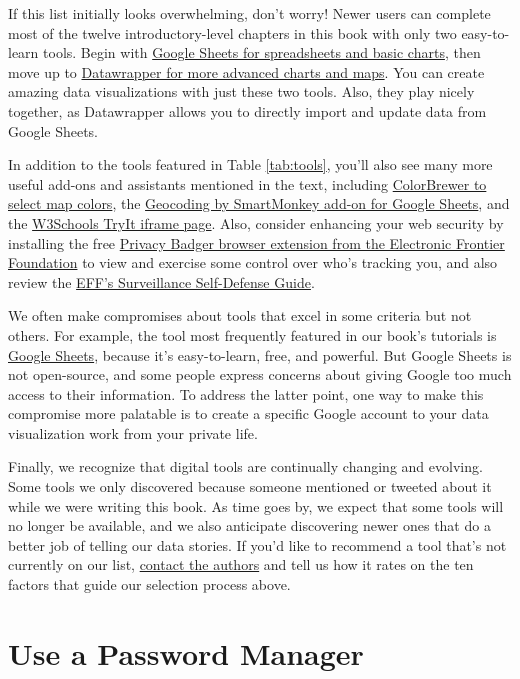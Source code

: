 \documentclass[
  english,
]{book}
\begin{document}
If this list initially looks overwhelming, don't worry! Newer users can complete most of the twelve introductory-level chapters in this book with only two easy-to-learn tools. Begin with \href{spreadsheet-tools.html}{Google Sheets for spreadsheets and basic charts}, then move up to \href{chart-datawrapper.html}{Datawrapper for more advanced charts and maps}. You can create amazing data visualizations with just these two tools. Also, they play nicely together, as Datawrapper allows you to directly import and update data from Google Sheets.

In addition to the tools featured in Table \ref{tab:tools}, you'll also see many more useful add-ons and assistants mentioned in the text, including \href{map-design.html}{ColorBrewer to select map colors}, the \href{geocode.html}{Geocoding by SmartMonkey add-on for Google Sheets}, and the \href{https://www.w3schools.com/tags/tryit.asp?filename=tryhtml_iframe}{W3Schools TryIt iframe page}. Also, consider enhancing your web security by installing the free \href{https://privacybadger.org/}{Privacy Badger browser extension from the Electronic Frontier Foundation} to view and exercise some control over who's tracking you, and also review the \href{https://ssd.eff.org/}{EFF's Surveillance Self-Defense Guide}.

We often make compromises about tools that excel in some criteria but not others. For example, the tool most frequently featured in our book's tutorials is \href{https://www.google.com/sheets/about/}{Google Sheets}, because it's easy-to-learn, free, and powerful. But Google Sheets is not open-source, and some people express concerns about giving Google too much access to their information. To address the latter point, one way to make this compromise more palatable is to create a specific Google account to your data visualization work from your private life.

Finally, we recognize that digital tools are continually changing and evolving. Some tools we only discovered because someone mentioned or tweeted about it while we were writing this book. As time goes by, we expect that some tools will no longer be available, and we also anticipate discovering newer ones that do a better job of telling our data stories. If you'd like to recommend a tool that's not currently on our list, \href{authors.html}{contact the authors} and tell us how it rates on the ten factors that guide our selection process above.

\hypertarget{password-manager}{%
\section*{Use a Password Manager}\label{password-manager}}
\end{document}
